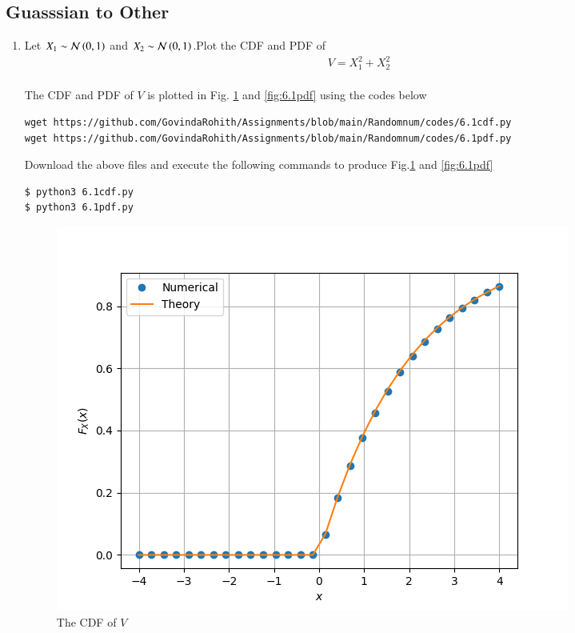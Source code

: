 \documentclass[journal,12pt,twocolumn]{IEEEtran}
\renewcommand\thesection{\arabic{section}}
\begin{document}
\begin{enumerate}[label=\thesection.\arabic*
,ref=\thesection.\theenumi]
\section{Guasssian to Other}
\begin{enumerate}[label=\thesection.\arabic*
,ref=\thesection.\theenumi]
\item Let $X_1  \sim \mathcal{N}\left(0,1\right) $ and
$X_2  \sim \mathcal{N}\left(0,1\right) $.Plot the CDF and PDF of 
\begin{align}
    V=X_1^2+X_2^2
    \end{align}
\solution\\
The CDF and PDF of $V$ is plotted in Fig. \ref{fig:6.1cdf} and \ref{fig:6.1pdf} using the codes below
\begin{lstlisting}
wget https://github.com/GovindaRohith/Assignments/blob/main/Randomnum/codes/6.1cdf.py
wget https://github.com/GovindaRohith/Assignments/blob/main/Randomnum/codes/6.1pdf.py
\end{lstlisting}
Download the above files and execute the following commands to produce Fig.\ref{fig:6.1cdf} and \ref{fig:6.1pdf}
\begin{lstlisting}
$ python3 6.1cdf.py
$ python3 6.1pdf.py
\end{lstlisting}
\begin{figure}[!h]
\centering
\includegraphics[width=\columnwidth]{./figs/6.1cdf.png}
\caption{The CDF of $V$}
\label{fig:6.1cdf}
\end{figure}
\addtocounter{figure}{+1}
\begin{figure}[!h]
\centering

\end{figure}
\end{enumerate}
\end{enumerate}
\end{document}
